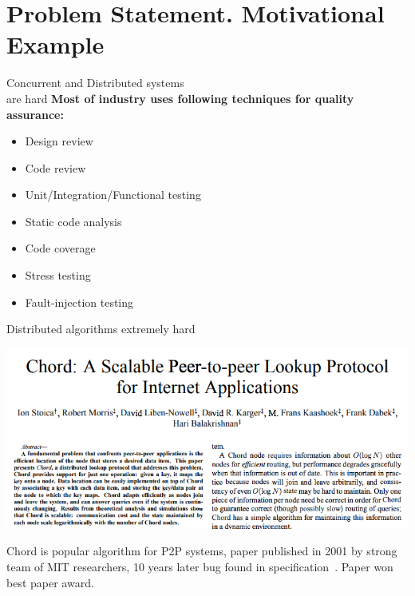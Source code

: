 \documentclass[12pt]{beamer}
\begin{document}
  \section{Problem Statement. Motivational Example}
  \begin{frame}{Concurrent and Distributed systems \\ are hard}
      \textbf{Most of industry uses following techniques for quality assurance:}
      \begin{itemize}
          \item Design review
          \item Code review
          \item Unit/Integration/Functional testing
          \item Static code analysis
          \item Code coverage
          \item Stress testing
          \item Fault-injection testing \cite{principlesofchaos}
      \end{itemize}
  \end{frame}
  \begin{frame}{Distributed algorithms extremely hard}
      \begin{center}
          \includegraphics[scale=0.3]{figures/chord_paper.png}
      \end{center}
      \begin{alertblock}{Chord}
          is popular algorithm for P2P systems, paper published in
          2001 by strong team of MIT researchers, 10 years later bug found
          in specification~\cite{stoica2001chord, Zave15}. Paper won best
          paper award.
      \end{alertblock}
  \end{frame}
\end{document}
